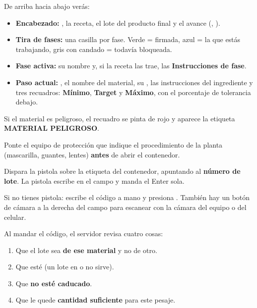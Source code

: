 De arriba hacia abajo verás:

\begin{itemize}
    \item \textbf{Encabezado:} , la receta, el lote del
          producto final y el avance (, ).
    \item \textbf{Tira de fases:} una casilla por fase. Verde = firmada, azul = la que
          estás trabajando, gris con candado = todavía bloqueada.
    \item \textbf{Fase activa:} su nombre y, si la receta las trae, las
          \textbf{Instrucciones de fase}.
    \item \textbf{Paso actual:} , el nombre del material, su
          , las instrucciones del ingrediente y tres recuadros:
          \textbf{Mínimo}, \textbf{Target} y \textbf{Máximo}, con el porcentaje de
          tolerancia debajo.
\end{itemize}

Si el material es peligroso, el recuadro se pinta de rojo y aparece la etiqueta
\textbf{MATERIAL PELIGROSO}.

\begin{cajaPeligro}
Ponte el equipo de protección que indique el procedimiento de la planta
(mascarilla, guantes, lentes) \textbf{antes} de abrir el contenedor.
\end{cajaPeligro}

\newpage
{}

Dispara la pistola sobre la etiqueta del contenedor, apuntando al \textbf{número de
lote}. La pistola escribe en el campo y manda el Enter sola.


\vspace{4pt}

Si no tienes pistola: escribe el código a mano y presiona .
También hay un botón de cámara a la derecha del campo para escanear con la cámara
del equipo o del celular.

Al mandar el código, el servidor revisa cuatro cosas:

\begin{enumerate}
    \item Que el lote sea \textbf{de ese material} y no de otro.
    \item Que esté \aprobado{} (un lote en \cuarentena{} o \rechazado{} no sirve).
    \item Que \textbf{no esté caducado}.
    \item Que le quede \textbf{cantidad suficiente} para este pesaje.
\end{enumerate}

